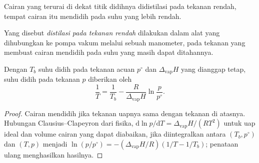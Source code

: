Cairan yang terurai di dekat titik didihnya didistilasi pada tekanan
rendah, tempat cairan itu mendidih pada suhu yang lebih rendah.

\begin{definition}\label{def:b2:lab-techniques-2:reduced-pressure}
Yang disebut \emph{distilasi pada tekanan rendah}
dilakukan dalam alat yang dihubungkan ke pompa vakum melalui sebuah
manometer, pada tekanan yang membuat cairan mendidih pada suhu yang masih
dapat ditahannya.
\end{definition}

\begin{proposition}\label{prop:b2:lab-techniques-2:reduced-pressure}
Dengan $T_b$ suhu didih pada tekanan acuan $p^\circ$ dan $\Delta_{\mathrm{vap}}H$
yang dianggap tetap, suhu didih pada tekanan $p$ diberikan oleh
\begin{equation*}
\frac{1}{T} = \frac{1}{T_b} - \frac{R}{\Delta_{\mathrm{vap}}H}\ln\frac{p}{p^\circ}.
\end{equation*}
\end{proposition}

\begin{proof}
Cairan mendidih jika tekanan uapnya sama dengan tekanan di atasnya. Hubungan
Clausius--Clapeyron dari fisika,
$\mathrm d\ln p/\mathrm dT = \Delta_{\mathrm{vap}}H/(RT^2)$ untuk uap ideal dan volume cairan yang
dapat diabaikan, jika diintegralkan antara $(T_b, p^\circ)$ dan $(T, p)$ menjadi $\ln(p/p^\circ) =
-(\Delta_{\mathrm{vap}}H/R)(1/T - 1/T_b)$; penataan ulang menghasilkan hasilnya.
\end{proof}

